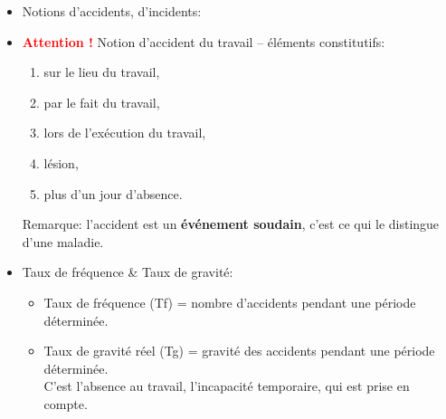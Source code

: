 \documentclass[a4paper]{article}
\begin{document}
\begin{itemize}
\item Notions d’accidents, d’incidents:
\begin{center}
\end{center}





\item \textcolor{red}{\textbf{Attention !}} Notion d'accident du travail -- éléments constitutifs:
\begin{enumerate}
    \item sur le lieu du travail,
    \item par le fait du travail,
    \item lors de l'exécution du travail,
    \item lésion,
    \item plus d'un jour d'absence.
\end{enumerate}
Remarque: l'accident est un \textbf{événement soudain}, c'est ce qui le distingue d'une maladie.





\item Taux de fréquence \& Taux de gravité:
\begin{itemize}
    \item Taux de fréquence (Tf) = nombre d’accidents pendant une période déterminée.
    \item Taux de gravité réel (Tg) = gravité des accidents pendant une période déterminée. \\
    C’est l’absence au travail, l’incapacité temporaire, qui est prise en compte.
\end{itemize}






\end{itemize}
\end{document}
